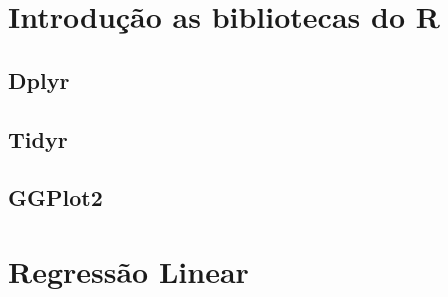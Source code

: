 \documentclass[
]{book}
\begin{document}
\hypertarget{introduuxe7uxe3o-as-bibliotecas-do-r}{%
\chapter{Introdução as bibliotecas do R}\label{introduuxe7uxe3o-as-bibliotecas-do-r}}

\hypertarget{dplyr}{%
\section{Dplyr}\label{dplyr}}

\hypertarget{tidyr}{%
\section{Tidyr}\label{tidyr}}

\hypertarget{ggplot2}{%
\section{GGPlot2}\label{ggplot2}}

\hypertarget{regressuxe3o-linear}{%
\chapter{Regressão Linear}\label{regressuxe3o-linear}}

  
\end{document}
